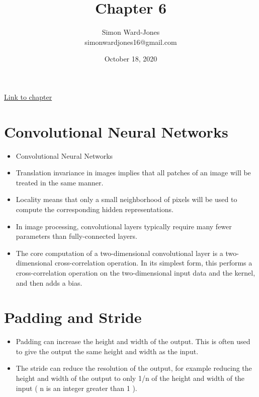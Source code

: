 \documentclass[12pt,notitlepage]{article}
\begin{document}


\title{\Large{\textbf{Chapter 6}}}
\date{October 18, 2020}
\author{Simon Ward-Jones\\simonwardjones16@gmail.com}

\maketitle
\href{https://d2l.ai/chapter_convolutional-neural-networks/index.html}{Link to chapter}

\section{Convolutional Neural Networks}
\begin{itemize}
    \item Convolutional Neural Networks
    \item Translation invariance in images implies that all patches of an image will be treated in the same manner.
    \item Locality means that only a small neighborhood of pixels will be used to compute the corresponding hidden representations.
    \item In image processing, convolutional layers typically require many fewer parameters than fully-connected layers.
    \item The core computation of a two-dimensional convolutional layer is a two-dimensional cross-correlation operation. In its simplest form, this performs a cross-correlation operation on the two-dimensional input data and the kernel, and then adds a bias.
\end{itemize}

\section{Padding and Stride}
\begin{itemize}
    \item Padding can increase the height and width of the output. This is often used to give the output the same height and width as the input.
    \item The stride can reduce the resolution of the output, for example reducing the height and width of the output to only 1/n  of the height and width of the input ( n is an integer greater than  1 ).
\end{itemize}
\vfill

\nocite{zhang2020dive}
\end{document}
